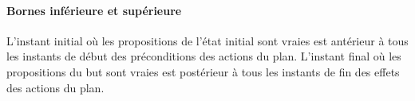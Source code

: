 \paragraph{Bornes inférieure et supérieure}

L’instant initial où les propositions de l’état initial sont vraies est antérieur à tous les instants de début des préconditions des actions du plan. L’instant final où les propositions du but sont vraies est postérieur à tous les instants de fin des effets des actions du plan.
